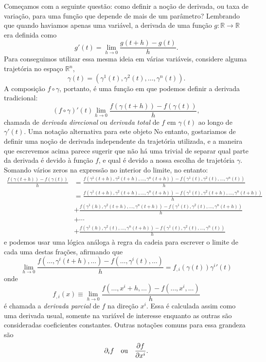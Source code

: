 \documentclass[a4paper, 12pt]{article}
\newcommand{\pd}[3]{\ifblank{#3}{}{\left(}\frac{\partial #1}{\partial #2}\ifblank{#3}{}{\right)_{#3}}}
\theoremstyle{definition}
\theoremstyle{definition}
\begin{document}
Começamos com a seguinte questão: como definir a noção de derivada, ou taxa de variação, para uma função que
depende de mais de um parâmetro? Lembrando que quando haviamos apenas uma variável, a derivada de uma função
$g:\mathbb R\rightarrow\mathbb R$ era definida como
$$g'(t)=\lim\limits_{h\rightarrow0}\frac{g(t+h)-g(t)}{h}.$$
Para conseguimos utilizar essa mesma ideia em várias variáveis, considere alguma trajetória no espaço 
$\mathbb R^n$,
$$\gamma(t)=(\gamma^1(t),\gamma^2(t),\dots,\gamma^n(t)).$$
A composição $f\circ\gamma$, portanto, é uma função em que podemos definir a derivada tradicional:
$$(f\circ\gamma)'(t)\lim\limits_{h\rightarrow0}\frac{f(\gamma(t+h))-f(\gamma(t))}{h},$$
chamada de \textit{derivada direcional} ou \textit{derivada total} de $f$ em $\gamma(t)$ ao longo de $\gamma'(t)$. 
Uma notação alternativa para este objeto 
No entanto, gostariamos de definir uma noção de derivada independente da trajetória utilizada, e a maneira 
que escrevemos acima parece sugerir que não há uma trivial de separar qual parte da derivada é devido à função $f$,
e qual é devido a nossa escolha de trajetória $\gamma$. Somando vários zeros na expressão no interior do limite, 
no entanto:
\begin{align*}
    \frac{f(\gamma(t+h))-f(\gamma(t))}{h}
    &=\frac{f(\gamma^1(t+h),\gamma^2(t+h),\dots,\gamma^n(t+h))-f(\gamma^1(t),\gamma^2(t),\dots,\gamma^n(t))}{h}\\
    &=\frac{f(\gamma^1(t+h),\gamma^2(t+h),\dots,\gamma^n(t+h))-f(\gamma^1(t),\gamma^2(t+h),\dots,\gamma^n(t+h))}{h}\\
    &+\frac{f(\gamma^1(h),\gamma^2(t+h),\dots,\gamma^n(t+h))-f(\gamma^1(t),\gamma^2(t),\dots,\gamma^n(t+h))}{h}\\
    &+\cdots\\
    &+\frac{f(\gamma^1(h),\gamma^2(t),\dots,\gamma^n(t+h))-f(\gamma^1(t),\gamma^2(t),\dots,\gamma^n(t))}{h}
\end{align*}
e podemos usar uma lógica análoga à regra da cadeia para escrever o limite de cada uma destas frações,
afirmando que
$$\lim\limits_{h\rightarrow0}\frac{f(\dots,\gamma^i(t+h),\dots)
-f(\dots,\gamma^i(t),\dots)}{h}=f_{,i}(\gamma(t))\gamma^i{'}(t)$$
onde
$$f_{,i}(x)\equiv\lim\limits_{h\rightarrow0}\frac{f(\dots,x^i+h,\dots)-f(\dots,x^i,\dots)}{h}$$
é chamada a \textit{derivada parcial} de $f$ na direção $x^i$. Essa é calculada assim como uma derivada
usual, somente na variável de interesse enquanto as outras são consideradas coeficientes constantes.
Outras notações comuns para essa grandeza são
$$\partial_i f\quad\text{ou}\quad\pd{f}{x^i}{}.$$
\end{document}
